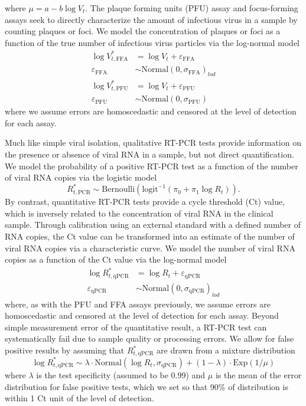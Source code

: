 \documentclass[11pt]{article}
\begin{document}
where $\mu = a - b \log V_t$. The plaque forming units (PFU) assay and focus-forming assays seek to directly characterize the amount of infectious virus in a sample by counting plaques or foci. We model the concentration of plaques or foci as a function of the true number of infectious virus particles via the log-normal model
\begin{align*}
    \log V^{*}_{t,\text{FFA}} &= \log V_t + \varepsilon_{\text{FFA}} \\
    \varepsilon_{\text{FFA}} &\sim \text{Normal}(0, \sigma_{\text{FFA}})_{lod} \\
    \log V^{*}_{t,\text{PFU}} &= \log V_t + \varepsilon_{\text{PFU}} \\
    \varepsilon_{\text{PFU}} &\sim \text{Normal}(0, \sigma_{\text{PFU}})
\end{align*}
where we assume errors are homoscedastic and censored at the level of detection for each assay. 

Much like simple viral isolation, qualitative RT-PCR tests provide information on the presence or absence of viral RNA in a sample, but not direct quantification. We model the probability of a positive RT-PCR test as a function of the number of viral RNA copies via the logistic model
\begin{equation*}
    R^{*}_{t,\text{PCR}} \sim \text{Bernoulli}(\text{logit}^{-1}(\pi_0 + \pi_1 \log R_t)).
\end{equation*}
By contrast, quantitative RT-PCR tests provide a cycle threshold (Ct) value, which is inversely related to the concentration of viral RNA in the clinical sample. Through calibration using an external standard with a defined number of RNA copies, the Ct value can be transformed into an estimate of the number of viral RNA copies via a characteristic curve. We model the number of viral RNA copies as a function of the Ct value via the log-normal model
\begin{align*}
    \log R^{*}_{t,\text{qPCR}} &= \log R_t + \varepsilon_{\text{qPCR}} \\
    \varepsilon_{\text{qPCR}} &\sim \text{Normal}(0, \sigma_{\text{qPCR}})_{lod}
\end{align*}
where, as with the PFU and FFA assays previously, we assume errors are homoscedastic and censored at the level of detection for each assay. Beyond simple measurement error of the quantitative result, a RT-PCR test can systematically fail due to sample quality or processing errors. We allow for false positive results by assuming that $R^{*}_{t,\text{qPCR}}$ are drawn from a mixture distribution
\begin{equation*}
    \log R^{*}_{t,\text{qPCR}} \sim \lambda \cdot \text{Normal}(\log R_t, \sigma_{\text{qPCR}}) + (1 - \lambda) \cdot \text{Exp}(1/\mu)
\end{equation*}
where $\lambda$ is the test specificity (assumed to be 0.99) and $\mu$ is the mean of the error distribution for false positive tests, which we set so that 90\% of distribution is within 1 Ct unit of the level of detection.
\end{document}
